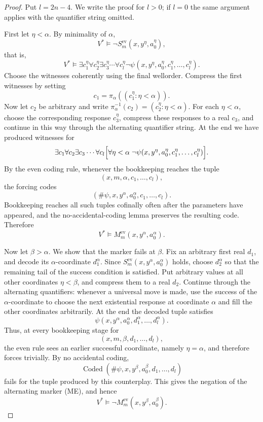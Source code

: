 \documentclass[a4paper,11pt]{article}
\begin{document}
\begin{proof}
Put $l=2n-4$.  We write the proof for $l>0$; if $l=0$ the same argument applies with the quantifier string omitted.

First let $\eta<\alpha$.  By minimality of $\alpha$,
\[
V^*\models \neg S^{\mathrm{ev}}_m(x,y^\eta,a_0^\eta),
\]
that is,
\[
V^*\models
\exists c_1^\eta\forall c_2^\eta\exists c_3^\eta\cdots\forall c_l^\eta\neg\psi(x,y^\eta,a_0^\eta,c_1^\eta,\ldots,c_l^\eta).
\]
Choose the witnesses coherently using the final wellorder.  Compress the first witnesses by setting
\[
c_1=\pi_\alpha((c_1^\eta:\eta<\alpha)).
\]
Now let $c_2$ be arbitrary and write $\pi_\alpha^{-1}(c_2)=(c_2^\eta:\eta<\alpha)$.  For each $\eta<\alpha$, choose the corresponding response $c_3^\eta$, compress these responses to a real $c_3$, and continue in this way through the alternating quantifier string.  At the end we have produced witnesses for
\[
\exists c_1\forall c_2\exists c_3\cdots\forall c_l
\Bigl[\forall\eta<\alpha\;\neg\psi(x,y^\eta,a_0^\eta,c_1^\eta,\ldots,c_l^\eta)\Bigr].
\]
By the even coding rule, whenever the bookkeeping reaches the tuple
\[
(x,m,\alpha,c_1,\ldots,c_l),
\]
the forcing codes
\[
(\#\psi,x,y^\alpha,a_0^\alpha,c_1,\ldots,c_l).
\]
Bookkeeping reaches all such tuples cofinally often after the parameters have appeared, and the no-accidental-coding lemma preserves the resulting code.  Therefore
\[
V^*\models M^{\mathrm{ev}}_m(x,y^\alpha,a_0^\alpha).
\]

Now let $\beta>\alpha$.  We show that the marker fails at $\beta$.  Fix an arbitrary first real $d_1$, and decode its $\alpha$-coordinate $d_1^\alpha$.  Since $S^{\mathrm{ev}}_m(x,y^\alpha,a_0^\alpha)$ holds, choose $d_2^\alpha$ so that the remaining tail of the success condition is satisfied.  Put arbitrary values at all other coordinates $\eta<\beta$, and compress them to a real $d_2$.  Continue through the alternating quantifiers: whenever a universal move is made, use the success of the $\alpha$-coordinate to choose the next existential response at coordinate $\alpha$ and fill the other coordinates arbitrarily.  At the end the decoded tuple satisfies
\[
\psi(x,y^\alpha,a_0^\alpha,d_1^\alpha,\ldots,d_l^\alpha).
\]
Thus, at every bookkeeping stage for
\[
(x,m,\beta,d_1,\ldots,d_l),
\]
the even rule sees an earlier successful coordinate, namely $\eta=\alpha$, and therefore forces trivially.  By no accidental coding,
\[
\operatorname{Coded}(\#\psi,x,y^\beta,a_0^\beta,d_1,\ldots,d_l)
\]
fails for the tuple produced by this counterplay.  This gives the negation of the alternating marker (ME), and hence
\[
V^*\models \neg M^{\mathrm{ev}}_m(x,y^\beta,a_0^\beta).
\]
\end{proof}
\end{document}
